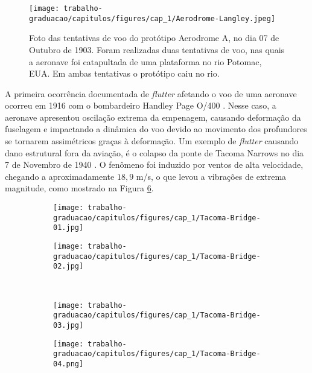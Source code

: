 \begin{figure}[ht]
    \centering
    \caption{Foto das tentativas de voo do protótipo Aerodrome A, no dia 07 de Outubro de 1903. Foram realizadas duas tentativas de voo, nas quais a aeronave foi catapultada de uma plataforma no rio Potomac, EUA. Em ambas tentativas o protótipo caiu no rio.}
    \noindent\texttt{[image: trabalho-graduacao/capitulos/figures/cap\_1/Aerodrome-Langley.jpeg]}
    \label{fig:cap1:Aerodrom-Langley}
\end{figure}

A primeira ocorrência documentada de \textit{flutter} afetando o voo de uma aeronave ocorreu em 1916 com o bombardeiro  Handley Page O/400 \cite{art:Le-2015}. Nesse caso, a aeronave apresentou oscilação extrema da empenagem, causando deformação da fuselagem e impactando a dinâmica do voo devido ao movimento dos profundores se tornarem assimétricos graças à deformação. Um exemplo de \textit{flutter} causando dano estrutural fora da aviação, é o colapso da ponte de Tacoma Narrows no dia 7 de Novembro de 1940 \cite{art:Billah-1990}. O fenômeno foi induzido por ventos de alta velocidade, chegando a aproximadamente $18,9$ m/s, o que levou a vibrações de extrema magnitude, como mostrado na Figura \ref{fig:cap1:Tacoma-Bridge}.

\begin{figure}[ht]
    \centering
    \caption{Fotos da ponte Tacoma Narrows, EUA colapsando em Novembro de 1940 devido ao \textit{flutter}; (\ref{fig:Tacoma-Oscilacao-01}) e (\ref{fig:Tacoma-Oscilacao-02}) mostram a amplitude das oscilações da seção central da ponte vista de cima, (\ref{fig:Tacoma-Oscilacao-03}) mostra a oscilação vista de fora da ponte, e (\ref{fig:Tacoma-Colapso}) apresenta uma foto após o colapso estrutural}
    \begin{subfigure}[t]{0.49\textwidth}
        \centering
        \caption{}
        \noindent\texttt{[image: trabalho-graduacao/capitulos/figures/cap\_1/Tacoma-Bridge-01.jpg]}
        \label{fig:Tacoma-Oscilacao-01}
    \end{subfigure}
    \begin{subfigure}[t]{0.49\textwidth}
        \centering
        \caption{}
        \noindent\texttt{[image: trabalho-graduacao/capitulos/figures/cap\_1/Tacoma-Bridge-02.jpg]}
        \label{fig:Tacoma-Oscilacao-02}
    \end{subfigure} \\
    \begin{subfigure}[t]{0.49\textwidth}
        \centering
        \noindent\texttt{[image: trabalho-graduacao/capitulos/figures/cap\_1/Tacoma-Bridge-03.jpg]}
        \caption{}
        \label{fig:Tacoma-Oscilacao-03}
    \end{subfigure}
    \begin{subfigure}[t]{0.49\textwidth}
        \centering
        \noindent\texttt{[image: trabalho-graduacao/capitulos/figures/cap\_1/Tacoma-Bridge-04.png]}
        \caption{}
        \label{fig:Tacoma-Colapso}
    \end{subfigure}
        \label{fig:cap1:Tacoma-Bridge}
\end{figure}

